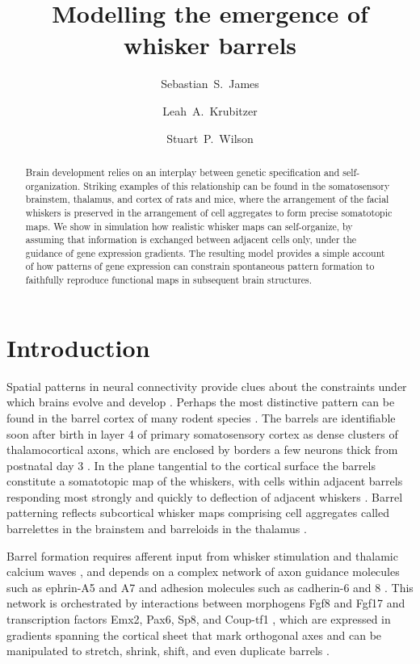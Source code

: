 \documentclass[9pt,lineno]{elife}
\title{Modelling the emergence of whisker barrels}
\author[1*]{Sebastian~S.~James}
\author[2]{Leah~A.~Krubitzer}
\author[1]{Stuart~P.~Wilson}
\affil[1]{Department of Psychology, The University of Sheffield, Sheffield, United Kingdom.}
\affil[2]{Center for Neuroscience, The University of California, Davis, United States.}
\newcommand{\cmnt}[1]{\textcolor{colcmnt}{#1}}
\begin{document}
\maketitle

\begin{abstract}
Brain development relies on an interplay between genetic specification and
self-organization. Striking examples of this relationship can be found in the
somatosensory brainstem, thalamus, and cortex of rats and mice, where the
arrangement of the facial whiskers is preserved in the arrangement of cell
aggregates to form precise somatotopic maps. We show in simulation how
realistic whisker maps can self-organize, by assuming that information is
exchanged between adjacent cells only, under the guidance of gene expression
gradients. The resulting model provides a simple account of how patterns of
gene expression can constrain spontaneous pattern formation to faithfully
reproduce functional maps in subsequent brain structures.
\end{abstract}

\section{Introduction}

Spatial patterns in neural connectivity provide clues about the constraints
under which brains evolve and develop \citep{purves_iterated_1992}. Perhaps
the most distinctive pattern can be found in the barrel cortex of many rodent
species \citep{woolsey_structural_1970}. The barrels are identifiable soon
after birth in layer 4 of primary somatosensory cortex as dense clusters of
thalamocortical axons, which are enclosed by borders a few neurons thick from
postnatal day 3 \citep{erzurumlu_development_2012}.
%
In the plane tangential to
the cortical surface the barrels constitute a somatotopic map of the whiskers,
with cells within adjacent barrels responding most strongly and quickly to
deflection of adjacent whiskers \citep{armstrong-james_flow_1992}. Barrel
patterning reflects subcortical whisker maps comprising cell aggregates called
barrelettes in the brainstem and barreloids in the thalamus
\citep{ma_barrelettesarchitectonic_1991,van_der_loos_barreloids_1976}.

Barrel formation requires afferent input from whisker stimulation and thalamic
calcium waves \citep{anton-bolanos_prenatal_2019}, and depends on a complex
network of axon guidance molecules such as ephrin-A5 and A7 and adhesion
molecules such as cadherin-6 and 8
\citep{vanderhaeghen_mapping_2000,miller_epha7-ephrin-a5_2006}.  This network
is orchestrated by interactions between morphogens Fgf8 and Fgf17 and
transcription factors Emx2, Pax6, Sp8, and Coup-tf1
\citep{shimogori_fibroblast_2005,bishop_regulation_2000}, which are expressed
in gradients \cmnt{spanning the cortical sheet} that mark orthogonal axes
and can be manipulated to stretch,
shrink, shift, and even duplicate barrels
\citep{assimacopoulos_fibroblast_2012}.
\end{document}
